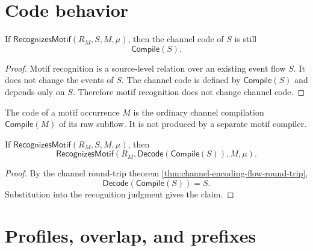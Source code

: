 \section{Code behavior}
\label{sec:motif-generated-code-behavior}

\begin{proposition}
\label{prop:motif-generated-recognition-preserves-code}
If $\mathsf{RecognizesMotif}(R_M,S,M,\mu)$, then the channel code of $S$ is still
$$
  \mathsf{Compile}(S).
$$
\end{proposition}

\begin{proof}
Motif recognition is a source-level relation over an existing event flow $S$. It does not change the events of $S$. The channel code is defined by $\mathsf{Compile}(S)$ and depends only on $S$. Therefore motif recognition does not change channel code.
\end{proof}

\begin{corollary}
\label{cor:motif-generated-code-not-separate}
The code of a motif occurrence $M$ is the ordinary channel compilation $\mathsf{Compile}(M)$ of its raw subflow. It is not produced by a separate motif compiler.
\end{corollary}

\begin{theorem}
\label{thm:motif-generated-compile-decode-invariant}
If $\mathsf{RecognizesMotif}(R_M,S,M,\mu)$, then
$$
  \mathsf{RecognizesMotif}(R_M,\mathsf{Decode}(\mathsf{Compile}(S)),M,\mu).
$$
\end{theorem}

\begin{proof}
By the channel round-trip theorem \autoref{thm:channel-encoding-flow-round-trip},
$$
  \mathsf{Decode}(\mathsf{Compile}(S))=S.
$$
Substitution into the recognition judgment gives the claim.
\end{proof}

\section{Profiles, overlap, and prefixes}
\label{sec:motif-generated-profiles-overlap-prefixes}

